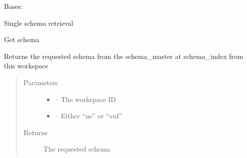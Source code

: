 \documentclass[letterpaper,10pt,english]{sphinxmanual}
\begin{document}
\begin{fulllineitems}
\label{_source/son_editor.apis:son_editor.apis.schemaapi.Schema}
Bases: 

Single schema retrieval

\begin{fulllineitems}
\label{_source/son_editor.apis:son_editor.apis.schemaapi.Schema.get}
Get schema

Returns the requested schema from the schema\_master at schema\_index from this workspace
\begin{quote}\begin{description}
\item[{Parameters}] \leavevmode\begin{itemize}
\item {} 
 -- The workspace ID

\item {} 
 -- Either ``ns'' or ``vnf''

\end{itemize}

\item[{Returns}] \leavevmode
The requested schema

\end{description}\end{quote}

\end{fulllineitems}


\begin{fulllineitems}
\label{_source/son_editor.apis:son_editor.apis.schemaapi.Schema.methods}
\end{fulllineitems}


\end{fulllineitems}

\end{document}
